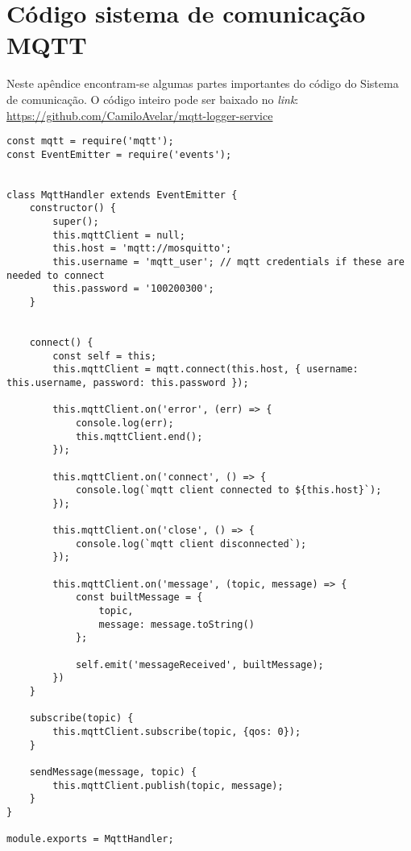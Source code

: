 \chapter{Código sistema de comunicação MQTT}

Neste apêndice encontram-se algumas partes importantes do código do Sistema de comunicação. O código inteiro pode ser baixado no \textit{link}: \url{https://github.com/CamiloAvelar/mqtt-logger-service}

\begin{lstlisting}[caption=Exemplo do código de comunicação MQTT]
const mqtt = require('mqtt');
const EventEmitter = require('events');


class MqttHandler extends EventEmitter {
	constructor() {
		super();
		this.mqttClient = null;
		this.host = 'mqtt://mosquitto';
		this.username = 'mqtt_user'; // mqtt credentials if these are needed to connect
		this.password = '100200300';
	}
	
	
	connect() {
		const self = this;
		this.mqttClient = mqtt.connect(this.host, { username: this.username, password: this.password });
		
		this.mqttClient.on('error', (err) => {
			console.log(err);
			this.mqttClient.end();
		});
		
		this.mqttClient.on('connect', () => {
			console.log(`mqtt client connected to ${this.host}`);
		});
		
		this.mqttClient.on('close', () => {
			console.log(`mqtt client disconnected`);
		});
		
		this.mqttClient.on('message', (topic, message) => {
			const builtMessage = {
				topic,
				message: message.toString()
			};
		
			self.emit('messageReceived', builtMessage);
		})
	}
	
	subscribe(topic) {
		this.mqttClient.subscribe(topic, {qos: 0});
	}
	
	sendMessage(message, topic) {
		this.mqttClient.publish(topic, message);
	}
}

module.exports = MqttHandler;
\end{lstlisting}

